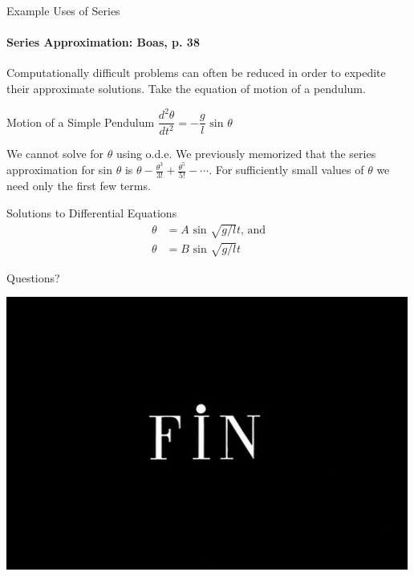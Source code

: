 \documentclass{beamer}
\begin{document}
\begin{frame}{Example Uses of Series}
	\framesubtitle{Series Approximation: Boas, p. 38}
	Computationally difficult problems can often be reduced in order to expedite their approximate solutions.  Take the equation of motion of a pendulum.
	\begin{exampleblock}{Motion of a Simple Pendulum}
	$\dfrac{d^{2}\theta}{dt^{2}} = -\dfrac{g}{l}\mbox{~sin\ }\theta$
	\end{exampleblock}
	We cannot solve for $\theta$ using o.d.e.  We previously memorized that the series approximation for sin $\theta$ is $\theta - \frac{\theta^{3}}{3!}+\frac{\theta^{5}}{5!}-\cdots$.  For sufficiently small values of $\theta$ we need only the first few terms.
	\begin{exampleblock}{Solutions to Differential Equations}
	\begin{align*}
	\theta &= A \mbox{~sin\ }\sqrt{g/l}t \mbox{, and} \\
	\theta &= B \mbox{~sin\ }\sqrt{g/l}t
	\end{align*}
	\end{exampleblock}
\end{frame}
  
\begin{frame}{Questions?}
	\begin{center}
		\includegraphics[width=.7\textwidth]{images/fin.png}
	\end{center}
\end{frame}
\end{document}
